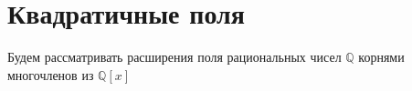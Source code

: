 \message{ !name(vkr.tex)}\documentclass[a4paper,12pt]{scrartcl}
\begin{document}

\section{Квадратичные поля}

Будем рассматривать расширения поля рациональных чисел $\mathbb{Q}$ корнями
многочленов из $\mathbb{Q} [x]$
\end{document}
